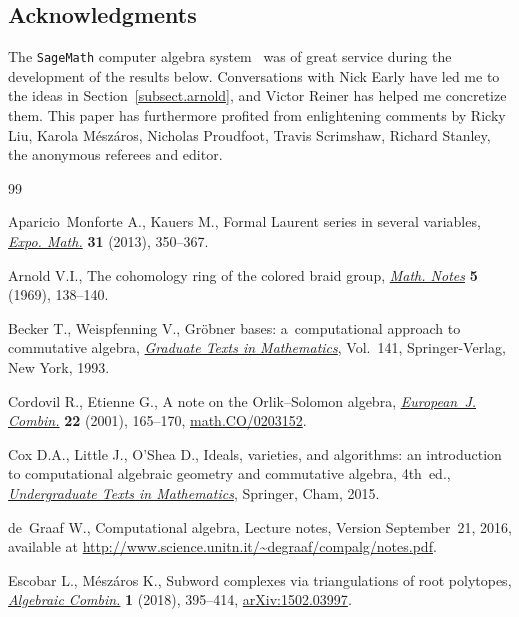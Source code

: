 \documentclass[pdftex]{sigma}
\numberwithin{equation}{section}
\begin{document}
\subsection*{Acknowledgments}

The \texttt{SageMath} computer algebra system~\cite{SageMath} was of great service during the development of the results below. Conversations with Nick Early have led me to the ideas in Section~\ref{subsect.arnold}, and Victor Reiner has helped me concretize them. This paper has furthermore profited from enlightening comments by Ricky Liu, Karola M\'{e}sz\'{a}ros, Nicholas Proudfoot, Travis Scrimshaw, Richard Stanley, the anonymous referees and editor.

\begin{thebibliography}{99}
\footnotesize\itemsep=0pt

Aparicio~Monforte A., Kauers M., Formal {L}aurent series in several variables,
 \href{https://doi.org/10.1016/j.exmath.2013.01.004}{\textit{Expo. Math.}} \textbf{31} (2013), 350--367.

Arnold V.I., The cohomology ring of the colored braid group, \href{https://doi.org/10.1007/BF01098313}{\textit{Math.
 Notes}} \textbf{5} (1969), 138--140.

Becker T., Weispfenning V., Gr\"obner bases: a~computational approach to
 commutative algebra, \href{https://doi.org/10.1007/978-1-4612-0913-3}{\textit{Graduate Texts in Mathematics}}, Vol.~141,
 Springer-Verlag, New York, 1993.

Cordovil R., Etienne G., A note on the {O}rlik--{S}olomon algebra,
 \href{https://doi.org/10.1006/eujc.2000.0445}{\textit{European~J. Combin.}} \textbf{22} (2001), 165--170,
 \href{https://arxiv.org/abs/math.CO/0203152}{math.CO/0203152}.

Cox D.A., Little J., O'Shea D., Ideals, varieties, and algorithms: an
 introduction to computational algebraic geometry and commutative algebra, 4th~ed., \href{https://doi.org/10.1007/978-3-319-16721-3}{\textit{Undergraduate Texts in Mathematics}}, Springer, Cham, 2015.

de~Graaf W., Computational algebra, {L}ecture notes, {V}ersion September~21,
 2016, available at \url{http://www.science.unitn.it/~degraaf/compalg/notes.pdf}.

Escobar L., M\'{e}sz\'{a}ros K., Subword complexes via triangulations of root
 polytopes, \href{https://doi.org/10.5802/alco.17}{\textit{Algebraic Combin.}} \textbf{1} (2018), 395--414,
 \href{https://arxiv.org/abs/1502.03997}{arXiv:1502.03997}.


\end{thebibliography}
\end{document}
